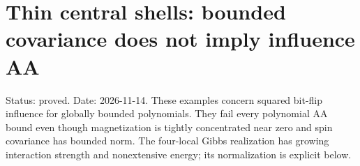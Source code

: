 \section{Thin central shells: bounded covariance does not imply influence
AA}\label{proof:thin_shell_obstruction}

Status: proved. Date: 2026-11-14. These examples concern squared
bit-flip influence for globally bounded polynomials. They fail every
polynomial AA bound even though magnetization is tightly concentrated
near zero and spin covariance has bounded norm. The four-local Gibbs
realization has growing interaction strength and nonextensive energy;
its normalization is explicit below.







